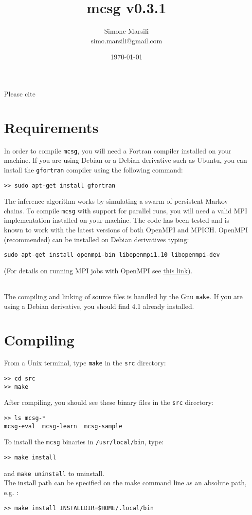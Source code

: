 \documentclass[a4paper,onecolumn]{article}
\title{mcsg v0.3.1}
\author{
        Simone Marsili \\
        simo.marsili@gmail.com
}
\date{\today}
\begin{document}
\maketitle

Please cite \cite{sutto2015residue}
\section{Requirements}
\label{sec:requirements}

In order to compile \verb|mcsg|, you will need a Fortran compiler installed on your machine.   
If you are using Debian or a Debian derivative such as Ubuntu, you can install the \verb|gfortran| compiler using the following command:
\begin{verbatim}
>> sudo apt-get install gfortran
\end{verbatim}

The inference algorithm works by simulating a swarm of persistent Markov chains. 
To compile \verb|mcsg| with support for parallel runs,
you will need a valid MPI implementation installed on your machine. 
The code has been tested and is known to work with the latest versions of both OpenMPI and MPICH.   
OpenMPI (recommended) can be installed on Debian derivatives typing:
\begin{verbatim}
sudo apt-get install openmpi-bin libopenmpi1.10 libopenmpi-dev
\end{verbatim}
(For details on running MPI jobs with OpenMPI see \href{https://www.open-mpi.org/faq/?category=running}{this link}).
\\\

The compiling and linking of source files is handled by the Gnu \verb|make|. 
If you are using a Debian derivative, you should find 4.1 already installed.

\section{Compiling}
\label{sec:compiling}
From a Unix terminal, type \verb|make| in the \verb|src| directory:
\begin{verbatim}
>> cd src
>> make
\end{verbatim}
After compiling, you should see these binary files in the \verb|src| directory:
\begin{verbatim}
>> ls mcsg-*
mcsg-eval  mcsg-learn  mcsg-sample
\end{verbatim}
To install the \verb|mcsg| binaries in \verb|/usr/local/bin|, type:
\begin{verbatim}
>> make install
\end{verbatim}
and \verb|make uninstall| to uninstall.\\
The install path can be specified on the make command line as an absolute path,
e.g. :
\begin{verbatim}
>> make install INSTALLDIR=$HOME/.local/bin
\end{verbatim}
\end{document}
